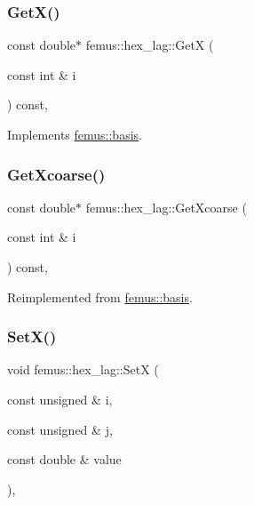 \subsubsection{\texorpdfstring{Get\+X()}{GetX()}}
{\footnotesize\ttfamily const double$\ast$ femus\+::hex\+\_\+lag\+::\+GetX (\begin{DoxyParamCaption}\item[{const int \&}]{i }\end{DoxyParamCaption}) const\hspace{0.3cm}{\ttfamily [inline]}, {\ttfamily [virtual]}}



Implements \mbox{\hyperlink{classfemus_1_1basis_a00597122bbc75877f1c184f8fce4986c}{femus\+::basis}}.

\mbox{\label{classfemus_1_1hex__lag_a85a1a616557275dca6954a04eaaf5042}} 
\subsubsection{\texorpdfstring{Get\+Xcoarse()}{GetXcoarse()}}
{\footnotesize\ttfamily const double$\ast$ femus\+::hex\+\_\+lag\+::\+Get\+Xcoarse (\begin{DoxyParamCaption}\item[{const int \&}]{i }\end{DoxyParamCaption}) const\hspace{0.3cm}{\ttfamily [inline]}, {\ttfamily [virtual]}}



Reimplemented from \mbox{\hyperlink{classfemus_1_1basis_afcabbbda61ede8f30158fe08ee0a5258}{femus\+::basis}}.

\mbox{\label{classfemus_1_1hex__lag_a74583e35eac434d56a9da2fd00d70038}} 
\subsubsection{\texorpdfstring{Set\+X()}{SetX()}}
{\footnotesize\ttfamily void femus\+::hex\+\_\+lag\+::\+SetX (\begin{DoxyParamCaption}\item[{const unsigned \&}]{i,  }\item[{const unsigned \&}]{j,  }\item[{const double \&}]{value }\end{DoxyParamCaption})\hspace{0.3cm}{\ttfamily [inline]}, {\ttfamily [virtual]}}



